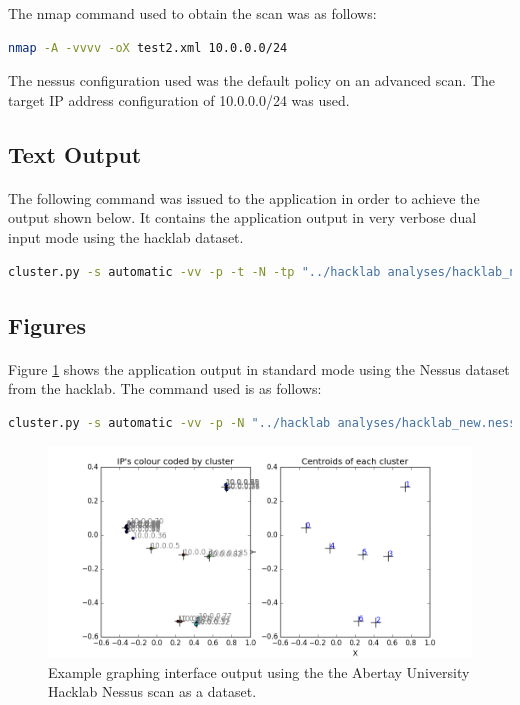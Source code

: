 The nmap command used to obtain the scan was as follows:
\begin{lstlisting}[language=bash]
nmap -A -vvvv -oX test2.xml 10.0.0.0/24
\end{lstlisting}
The nessus configuration used was the default policy on an advanced scan. The target IP address configuration of 10.0.0.0/24 was used.

\subsection{Text Output}
\label{hacklabtext}
\paragraph{}The following command was issued to the application in order to achieve the output shown below. It contains the application output in very verbose dual input mode using the hacklab dataset.
\begin{lstlisting}[language=bash]
cluster.py -s automatic -vv -p -t -N -tp "../hacklab analyses/hacklab_new.xml" "../hacklab analyses/hacklab_new.nessus"
\end{lstlisting}




\subsection{Figures}
\paragraph{}Figure \ref{split_nessus} shows the application output in standard mode using the Nessus dataset from the hacklab. The command used is as follows:
\begin{lstlisting}[language=bash]
cluster.py -s automatic -vv -p -N "../hacklab analyses/hacklab_new.nessus"
\end{lstlisting}
\begin{figure}[!h]
\centering
\includegraphics[width=5.5in]{./Figures/split_nessus.png}
\caption{Example graphing interface output using the the Abertay University Hacklab Nessus scan as a dataset.}
\label{split_nessus}
\end{figure}

